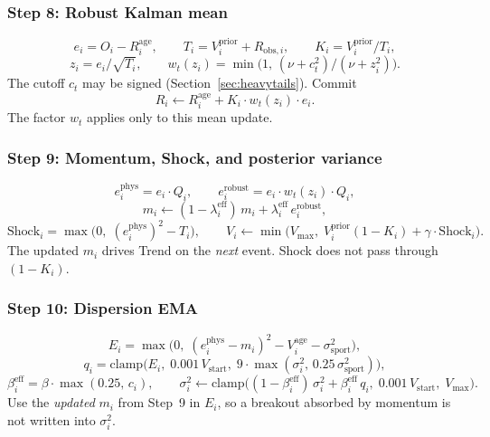 \documentclass[12pt]{article}
\newcommand{\sigmai}{\sigma_i^2}
\newcommand{\ssport}{\sigma_{\mathrm{sport}}^2}      %
\newcommand{\vstart}{V_{\mathrm{start}}}
\newcommand{\vmax}{V_{\mathrm{max}}}
\newcommand{\betad}{\beta}      %
\newcommand{\gammad}{\gamma}    %
\newcommand{\lambdad}{\lambda}  %
\newcommand{\nudof}{\nu}       %
\newcommand{\ctcut}{c_t}       %
\newcommand{\ephys}{e_i^{\mathrm{phys}}}
\newcommand{\erobust}{e_i^{\mathrm{robust}}}
\begin{document}
	\subsubsection*{Step 8: Robust Kalman mean}
	\begin{equation}
		e_i = O_i - R_i^{\mathrm{age}}, \qquad
		T_i = V_i^{\mathrm{prior}} + R_{\mathrm{obs},i}, \qquad
		K_i = V_i^{\mathrm{prior}} / T_i,
	\end{equation}
	\begin{equation}
		z_i = e_i / \sqrt{T_i}, \qquad
		w_t(z_i) = \min\!\bigl(1,\, (\nudof + \ctcut^2)/(\nudof + z_i^2)\bigr).
	\end{equation}
	The cutoff $\ctcut$ may be signed (Section~\ref{sec:heavytails}). Commit
	\begin{equation}
		R_i \leftarrow R_i^{\mathrm{age}} + K_i \cdot w_t(z_i) \cdot e_i.
	\end{equation}
	The factor $w_t$ applies only to this mean update.

	\subsubsection*{Step 9: Momentum, Shock, and posterior variance}
	\begin{equation}
		\ephys = e_i \cdot Q_i, \qquad \erobust = e_i \cdot w_t(z_i) \cdot Q_i,
	\end{equation}
	\begin{equation}
		m_i \leftarrow (1 - \lambdad_i^{\mathrm{eff}})\, m_i + \lambdad_i^{\mathrm{eff}}\, \erobust,
	\end{equation}
	\begin{equation}
		\mathrm{Shock}_i = \max\bigl(0,\; (\ephys)^2 - T_i\bigr), \qquad
		V_i \leftarrow \min\bigl(\vmax,\; V_i^{\mathrm{prior}}(1-K_i) + \gammad \cdot \mathrm{Shock}_i\bigr).
	\end{equation}
	The updated $m_i$ drives Trend on the \emph{next} event. Shock does not pass through $(1-K_i)$.

	\subsubsection*{Step 10: Dispersion EMA}
	\begin{equation}
		E_i = \max\bigl(0,\; (\ephys - m_i)^2 - V_i^{\mathrm{age}} - \ssport\bigr),
	\end{equation}
	\begin{equation}
		q_i = \mathrm{clamp}\bigl(E_i,\; 0.001\,\vstart,\; 9\cdot\max(\sigmai,\, 0.25\,\ssport)\bigr),
	\end{equation}
	\begin{equation}
		\betad_i^{\mathrm{eff}} = \betad \cdot \max(0.25,\, c_i), \qquad
		\sigmai \leftarrow \mathrm{clamp}\bigl((1-\betad_i^{\mathrm{eff}})\,\sigmai + \betad_i^{\mathrm{eff}}\, q_i,\; 0.001\,\vstart,\; \vmax\bigr).
	\end{equation}
	Use the \emph{updated} $m_i$ from Step~9 in $E_i$, so a breakout absorbed by momentum is not written into $\sigmai$.
\end{document}
